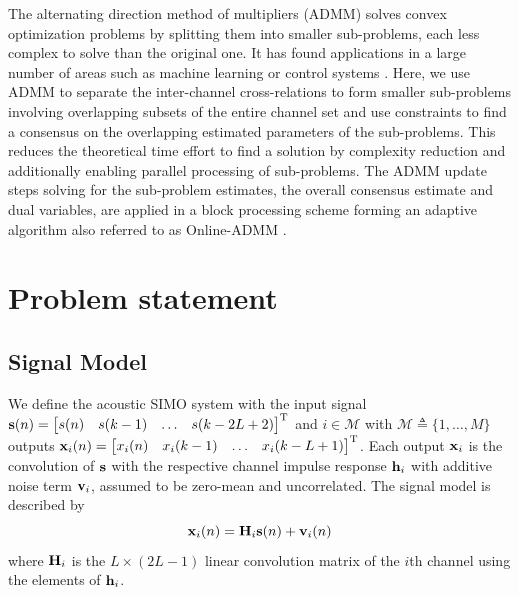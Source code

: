 \documentclass{article}
\newcommand{\h}{\mtxb{h}}
\newcommand{\x}{\mtxb{x}}
\newcommand{\Mset}{\mathcal{M}}
\begin{document}
The alternating direction method of multipliers (ADMM) \cite{} solves convex optimization problems by splitting them into smaller sub-problems, each less complex to solve than the original one.
It has found applications in a large number of areas such as machine learning \cite{} or control systems \cite{}.
Here, we use ADMM to separate the inter-channel cross-relations to form smaller sub-problems involving overlapping subsets of the entire channel set and use constraints to find a consensus on the overlapping estimated parameters of the sub-problems.
This reduces the theoretical time effort to find a solution by complexity reduction and additionally enabling parallel processing of sub-problems.
The ADMM update steps solving for the sub-problem estimates, the overall consensus estimate and dual variables, are applied in a block processing scheme forming an adaptive algorithm also referred to as Online-ADMM \cite{}.



\section{Problem statement}
\label{sec:problem_statement}


\subsection{Signal Model}
\label{ssec:signal_model}
We define the acoustic SIMO system with the input signal \(\bm{\mathrm{s}}(n) = \begin{bmatrix}
    s(n)&s(k-1)&\ldots&s(k-2L+2)
\end{bmatrix}^{{\mathrm{T}}}\) and \(i \in \Mset\) with \(\Mset \triangleq \{1,\ldots,M\} \) outputs 
\(
    \x_i(n) = \begin{bmatrix}
        x_i(n)&x_i(k-1)&\ldots&x_i(k-L+1)
    \end{bmatrix}^{\T}
\).
Each output \(\x_i\) is the convolution of \(\bm{\mathrm{s}}\) with the respective channel impulse response \(\h_i\) with additive noise term \(\bm{\mathrm{v}}_i\), assumed to be zero-mean and uncorrelated.
The signal model is described by
\begin{equation}
    \x_i(n) = \mtxb{H}_i \mtxb{s}(n) + \mtxb{v}_i(n)
\end{equation}
where \(\bm{\mathrm{H}}_i\) is the \(L \times (2L-1)\) linear convolution matrix of the \(i\)th channel using the elements of \(\h_i\).
\end{document}
